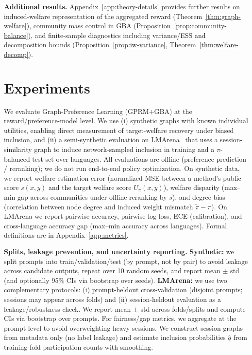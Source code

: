 \documentclass{article}
\theoremstyle{plain}
\theoremstyle{definition}
\theoremstyle{remark}
\begin{document}
\textbf{Additional results.}
Appendix~\ref{app:theory-details} provides further results on induced-welfare representation of the aggregated reward
(Theorem~\ref{thm:graph-welfare}), community mass control in GBA (Proposition~\ref{prop:community-balance}),
and finite-sample diagnostics including variance/ESS and decomposition bounds (Proposition~\ref{prop:iw-variance},
Theorem~\ref{thm:welfare-decomp}).


\section{Experiments}
\label{sec:experiments}

We evaluate Graph-Preference Learning (GPRM+GBA) at the
reward/preference-model level. We use (i) synthetic graphs with known
individual utilities, enabling direct measurement of target-welfare recovery
under biased inclusion, and (ii) a semi-synthetic evaluation on LMArena~\citep{chiang2024chatbotarena} that uses a
session-similarity graph to induce network-sampled inclusion in training and a
$\pi$-balanced test set over languages.
All evaluations are offline (preference prediction / reranking); we do not run end-to-end policy optimization. On synthetic data, we report welfare estimation error (normalized MSE
between a method's public score $s(x,y)$ and the target welfare score
$U_\pi(x,y)$), welfare disparity (max--min gap across communities under
offline reranking by $s$), and degree bias (correlation between node
degree and induced weight mismatch $\tilde\pi-\pi$). On LMArena we report
pairwise accuracy, pairwise log loss, ECE (calibration),
and cross-language accuracy gap (max--min accuracy across languages). Formal
definitions are in Appendix~\ref{app:metrics}.

\textbf{Splits, leakage prevention, and uncertainty reporting.}
\textbf{Synthetic:} we split prompts into train/validation/test (by prompt, not
by pair) to avoid leakage across candidate outputs, repeat over 10 random seeds,
and report mean $\pm$ std (and optionally 95\% CIs via bootstrap over seeds).
\textbf{LMArena:} we use two complementary protocols: (i) prompt-heldout
cross-validation (disjoint prompts; sessions may appear across folds) and
(ii) session-heldout evaluation as a leakage/robustness check. We report mean
$\pm$ std across folds/splits and compute CIs via bootstrap over prompts. For
fairness/gap metrics, we aggregate at the prompt level to avoid overweighting
heavy sessions. We construct session graphs from metadata only (no label
leakage) and estimate inclusion probabilities $\hat q$ from training-fold
participation counts with smoothing.
\end{document}
